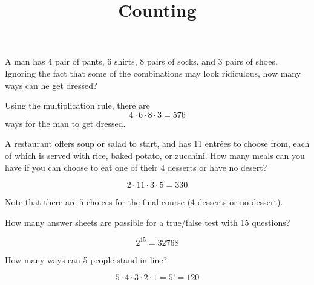 \documentclass[answers,11pt]{exam}
\title{Counting}
\begin{document}
\begin{questions}



\question A man has 4 pair of pants, 6 shirts, 8 pairs of socks, and 3 pairs of
shoes.  Ignoring the fact that some of the combinations may look ridiculous,
how many ways can he get dressed?

\begin{solution}
Using the multiplication rule, there are
\[
  4 \cdot 6 \cdot 8 \cdot 3 = 576
\]
ways for the man to get dressed.
\end{solution}



\question A restaurant offers soup or salad to start, and has 11 entr\'ees to choose
from, each of which is served with rice, baked potato, or zucchini.   How many
meals can you have if you can choose to eat one of their 4 desserts or have no
desert?

\begin{solution}
\[
  2 \cdot 11 \cdot 3 \cdot 5 = 330
\]

Note that there are $5$ choices for the final course (4 desserts or no
dessert).

\end{solution}



\question How many answer sheets are possible for a true/false test with 15
questions?

\begin{solution}
\[
  2^{15} = 32768
\]
\end{solution}






\question How many ways can 5 people stand in line?

\begin{solution}
\[
  5 \cdot 4 \cdot 3 \cdot 2 \cdot 1 = 5! = 120
\]
\end{solution}


\end{questions}
\end{document}
